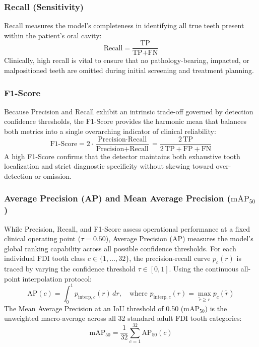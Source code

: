 \documentclass[10pt,journal,compsoc]{IEEEtran}
\begin{document}
\subsubsection{Recall (Sensitivity)}
Recall measures the model's completeness in identifying all true teeth present within the patient's oral cavity:
\begin{equation}
\text{Recall} = \frac{\text{TP}}{\text{TP} + \text{FN}}
\end{equation}
Clinically, high recall is vital to ensure that no pathology-bearing, impacted, or malpositioned teeth are omitted during initial screening and treatment planning.

\subsubsection{F1-Score}
Because Precision and Recall exhibit an intrinsic trade-off governed by detection confidence thresholds, the F1-Score provides the harmonic mean that balances both metrics into a single overarching indicator of clinical reliability:
\begin{equation}
\text{F1-Score} = 2 \cdot \frac{\text{Precision} \cdot \text{Recall}}{\text{Precision} + \text{Recall}} = \frac{2\,\text{TP}}{2\,\text{TP} + \text{FP} + \text{FN}}
\end{equation}
A high F1-Score confirms that the detector maintains both exhaustive tooth localization and strict diagnostic specificity without skewing toward over-detection or omission.

\subsubsection{Average Precision (AP) and Mean Average Precision (\texorpdfstring{$\text{mAP}_{50}$}{mAP50})}
While Precision, Recall, and F1-Score assess operational performance at a fixed clinical operating point ($\tau = 0.50$), Average Precision ($\text{AP}$) measures the model's global ranking capability across all possible confidence thresholds. For each individual FDI tooth class $c \in \{1,\dots,32\}$, the precision-recall curve $p_c(r)$ is traced by varying the confidence threshold $\tau \in [0, 1]$. Using the continuous all-point interpolation protocol:
\begin{equation}
\text{AP}(c) = \int_{0}^{1} p_{\text{interp}, c}(r) \, dr, \quad \text{where } p_{\text{interp}, c}(r) = \max_{\tilde{r} \ge r} p_c(\tilde{r})
\end{equation}
The Mean Average Precision at an IoU threshold of 0.50 ($\text{mAP}_{50}$) is the unweighted macro-average across all 32 standard adult FDI tooth categories:
\begin{equation}
\text{mAP}_{50} = \frac{1}{32} \sum_{c=1}^{32} \text{AP}_{50}(c)
\end{equation}
\end{document}
